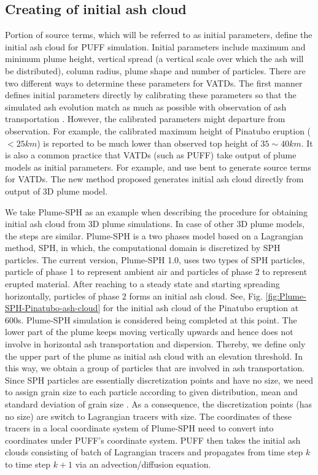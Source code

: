 \subsection{Creating of initial ash cloud}

Portion of source terms, which will be referred to as initial parameters, define the initial ash cloud for PUFF simulation. Initial parameters include maximum and minimum plume height, vertical spread (a vertical scale over which the ash will be distributed), column radius, plume shape and number of particles. There are two different ways to determine these parameters for VATDs. The first manner defines initial parameters directly by calibrating these parameters so that the simulated ash evolution match as much as possible with observation of ash transportation \citep[e.g.][]{fero2008simulation,fero2009simulating}. However, the calibrated parameters might departure from observation. For example, the calibrated maximum height of Pinatubo eruption ($<25 km$) is reported to be much lower \citep{fero2009simulating} than observed top height of $35 \sim 40 km$. It is also a common practice that VATDs (such as PUFF) take output of plume models as initial parameters. For example, \citet{bursik2012estimation} and \citet{ stefanescu2014temporal} use bent \citep{bursik2001effect} to generate source terms for VATDs. The new method proposed generates initial ash cloud directly from output of 3D plume model.

We take Plume-SPH as an example when describing the procedure for obtaining initial ash cloud from 3D plume simulations. In case of other 3D plume models, the steps are similar. Plume-SPH is a two phases model based on a Lagrangian method, SPH, in which, the computational domain is discretized by SPH particles. The current version, Plume-SPH 1.0, uses two types of SPH particles, particle of phase 1 to represent ambient air and particles of phase 2 to represent erupted material. After reaching to a steady state and starting spreading horizontally, particles of phase 2 forms an initial ash cloud. See, Fig. \ref{fig:Plume-SPH-Pinatubo-ash-cloud} for the initial ash cloud of the Pinatubo eruption at 600s. Plume-SPH simulation is considered being completed at this point. The lower part of the plume keeps moving vertically upwards and hence does not involve in horizontal ash transportation and dispersion. Thereby, we define only the upper part of the plume as initial ash cloud with an elevation threshold. In this way, we obtain a group of particles that are involved in ash transportation. Since SPH particles are essentially discretization points and have no size, we need to assign grain size to each particle according to given distribution, mean and standard deviation of grain size \citep{paladio1996tephra}. As a consequence, the discretization points (has no size) are switch to Lagrangian tracers with size. The coordinates of these tracers in a local coordinate system of Plume-SPH need to convert into coordinates under PUFF's coordinate system. PUFF then takes the initial ash clouds consisting of batch of Lagrangian tracers and propagates from time step $k$ to time step $k+1$ via an advection/diffusion equation.


